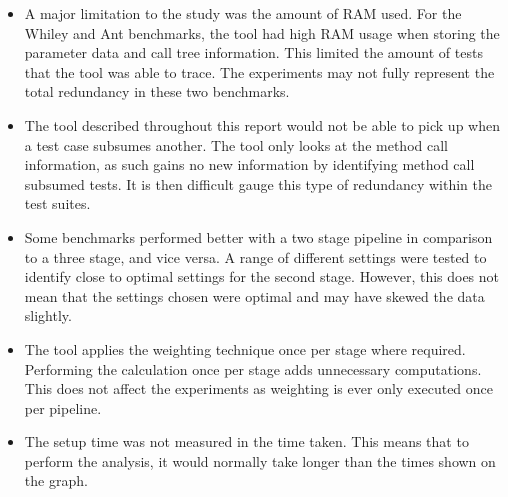 \begin{itemize}

\item A major limitation to the study was the amount of RAM used. For the Whiley and Ant benchmarks, the tool had high RAM usage when storing the parameter data and call tree information. This limited the amount of tests that the tool was able to trace. The experiments may not fully represent the total redundancy in these two benchmarks.

\item The tool described throughout this report would not be able to pick up when a test case subsumes another. The tool only looks at the method call information, as such gains no new information by identifying method call subsumed tests. It is then difficult gauge this type of redundancy within the test suites.

\item Some benchmarks performed better with a two stage pipeline in comparison to a three stage, and vice versa. A range of different settings were tested to identify close to optimal settings for the second stage. However, this does not mean that the settings chosen were optimal and may have skewed the data slightly.

\item The tool applies the weighting technique once per stage where required. Performing the calculation once per stage adds unnecessary computations. This does not affect the experiments as weighting is ever only executed once per pipeline.

\item The setup time was not measured in the time taken. This means that to perform the analysis, it would normally take longer than the times shown on the graph.
\end{itemize}
